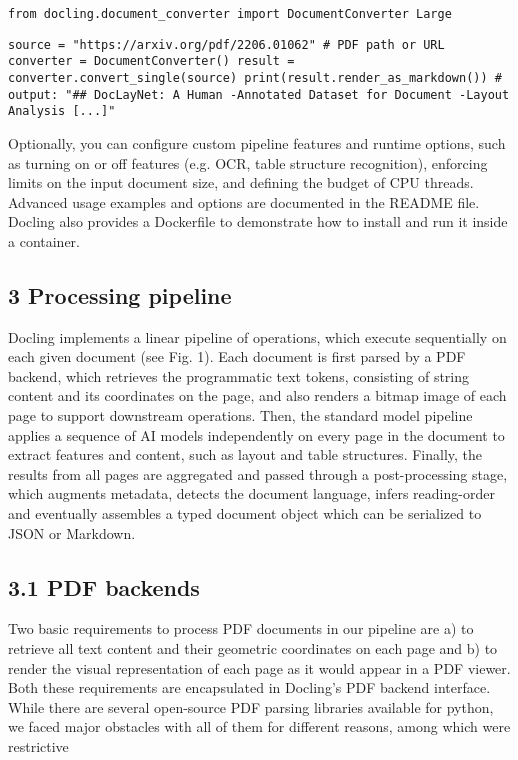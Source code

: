 \begin{verbatim}
from docling.document_converter import DocumentConverter Large
\end{verbatim}

\begin{verbatim}
source = "https://arxiv.org/pdf/2206.01062" # PDF path or URL converter = DocumentConverter() result = converter.convert_single(source) print(result.render_as_markdown()) # output: "## DocLayNet: A Human -Annotated Dataset for Document -Layout Analysis [...]"
\end{verbatim}

Optionally, you can configure custom pipeline features and runtime options, such as turning on or off features (e.g. OCR, table structure recognition), enforcing limits on the input document size, and defining the budget of CPU threads. Advanced usage examples and options are documented in the README file. Docling also provides a Dockerfile to demonstrate how to install and run it inside a container.

\subsection{3 Processing pipeline}

Docling implements a linear pipeline of operations, which execute sequentially on each given document (see Fig. 1). Each document is first parsed by a PDF backend, which retrieves the programmatic text tokens, consisting of string content and its coordinates on the page, and also renders a bitmap image of each page to support downstream operations. Then, the standard model pipeline applies a sequence of AI models independently on every page in the document to extract features and content, such as layout and table structures. Finally, the results from all pages are aggregated and passed through a post-processing stage, which augments metadata, detects the document language, infers reading-order and eventually assembles a typed document object which can be serialized to JSON or Markdown.

\subsection{3.1 PDF backends}

Two basic requirements to process PDF documents in our pipeline are a) to retrieve all text content and their geometric coordinates on each page and b) to render the visual representation of each page as it would appear in a PDF viewer. Both these requirements are encapsulated in Docling's PDF backend interface. While there are several open-source PDF parsing libraries available for python, we faced major obstacles with all of them for different reasons, among which were restrictive

